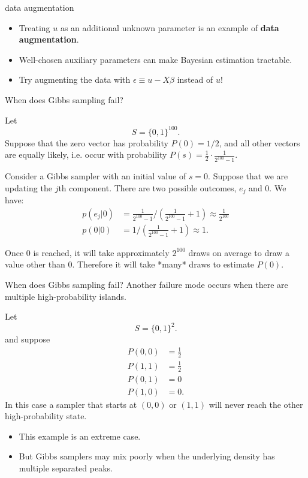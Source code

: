 \documentclass[aspectratio=169]{beamer}
\begin{document}
%
\begin{frame}{data augmentation}
\begin{itemize}
\item Treating $u$ as an additional unknown parameter is an example of
\textbf{data augmentation}.
\item Well-chosen auxiliary parameters can make Bayesian estimation tractable.
\item Try augmenting the data with $\epsilon\equiv u-X\beta$ instead of
$u$! 
\end{itemize}
\end{frame}
%
\begin{frame}{When does Gibbs sampling fail?}
\small
\begin{example}
Let 
\[
S=\{0,1\}^{100}.
\]
Suppose that the zero vector has probability $P(0)=1/2$, and all
other vectors are equally likely, i.e. occur with probability $P(s)=\frac{1}{2}\cdot\frac{1}{2^{100}-1}.$ 

Consider a Gibbs sampler with an initial value of $s=0$. Suppose
that we are updating the $j$th component. There are two possible
outcomes, $e_{j}$ and $0.$ We have:
\begin{align*}
p(e_{j}|0) & =\frac{1}{2^{100}-1}/\left(\frac{1}{2^{100}-1}+1\right)\approx\frac{1}{2^{100}}\\
p(0|0) & =1/\left(\frac{1}{2^{100}-1}+1\right)\approx1.
\end{align*}
 
\end{example}
Once $0$ is reached, it will take approximately $2^{100}$ draws
on average to draw a value other than $0.$ Therefore it will take
{*}many{*} draws to estimate $P(0).$ 
\end{frame}
%
\begin{frame}{When does Gibbs sampling fail?}
\footnotesize
Another failure mode occurs when there are multiple high-probability
islands.
\begin{example}
Let 
\[
S=\{0,1\}^{2}.
\]
 and suppose 
 {\footnotesize
\begin{align*}
P(0,0) & =\frac{1}{2}\\
P(1,1) & =\frac{1}{2}\\
P(0,1) & =0\\
P(1,0) & =0.
\end{align*}
}
 In this case a sampler that starts at $(0,0)$ or $(1,1)$ will never
reach the other high-probability state.
\end{example}
\begin{itemize}
\item This example is an extreme case.
\item But Gibbs samplers may mix poorly when the underlying
density has multiple separated peaks.
\end{itemize}
\end{frame}
\end{document}
